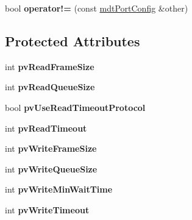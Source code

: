 \begin{DoxyCompactItemize}
\item 
\hypertarget{classmdt_port_config_a5a539c86934d41306a3ed18a8292457d}{
bool {\bfseries operator!=} (const \hyperlink{classmdt_port_config}{mdtPortConfig} \&other)}
\label{classmdt_port_config_a5a539c86934d41306a3ed18a8292457d}

\end{DoxyCompactItemize}
\subsection*{Protected Attributes}
\begin{DoxyCompactItemize}
\item 
\hypertarget{classmdt_port_config_a89f0ded07219e4ddbec5f6f20a3798d5}{
int {\bfseries pvReadFrameSize}}
\label{classmdt_port_config_a89f0ded07219e4ddbec5f6f20a3798d5}

\item 
\hypertarget{classmdt_port_config_a999e392fa0d1e97428cef3d45a0f7983}{
int {\bfseries pvReadQueueSize}}
\label{classmdt_port_config_a999e392fa0d1e97428cef3d45a0f7983}

\item 
\hypertarget{classmdt_port_config_a1a5ab2cf82ea35db627aa8b87f9dba2e}{
bool {\bfseries pvUseReadTimeoutProtocol}}
\label{classmdt_port_config_a1a5ab2cf82ea35db627aa8b87f9dba2e}

\item 
\hypertarget{classmdt_port_config_a69fa9f6cb32469f3eccfe7517dc29101}{
int {\bfseries pvReadTimeout}}
\label{classmdt_port_config_a69fa9f6cb32469f3eccfe7517dc29101}

\item 
\hypertarget{classmdt_port_config_aeaeb93ea4d49f66ff9613c7499e670f4}{
int {\bfseries pvWriteFrameSize}}
\label{classmdt_port_config_aeaeb93ea4d49f66ff9613c7499e670f4}

\item 
\hypertarget{classmdt_port_config_a547f27521b405528f86259fa9aaa37c5}{
int {\bfseries pvWriteQueueSize}}
\label{classmdt_port_config_a547f27521b405528f86259fa9aaa37c5}

\item 
\hypertarget{classmdt_port_config_a098926b5811c5a3a876fbc01409437b9}{
int {\bfseries pvWriteMinWaitTime}}
\label{classmdt_port_config_a098926b5811c5a3a876fbc01409437b9}

\item 
\hypertarget{classmdt_port_config_ad840fd68971a9ccc6092ce2aa3167591}{
int {\bfseries pvWriteTimeout}}
\label{classmdt_port_config_ad840fd68971a9ccc6092ce2aa3167591}


\end{DoxyCompactItemize}
